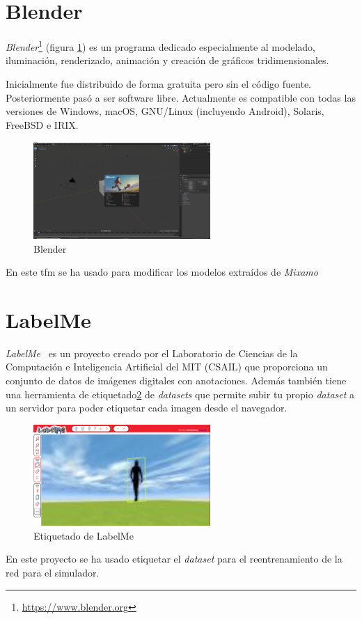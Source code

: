 \section{Blender} \label{sec:blender}
\textit{Blender}\footnote{\url{https://www.blender.org}} (figura \ref{fig:blender}) es un programa dedicado especialmente al modelado, iluminación, renderizado, animación y creación de gráficos tridimensionales.

Inicialmente fue distribuido de forma gratuita pero sin el código fuente. Posteriormente pasó a ser software libre. Actualmente es compatible con todas las versiones de Windows, macOS, GNU/Linux (incluyendo Android), Solaris, FreeBSD e IRIX.
\begin{figure}[H]
  \begin{center}
    \includegraphics[width=0.6\textwidth]{figures/herramientas/blender.png}
		\caption{Blender}
		\label{fig:blender}
		\end{center}
\end{figure}
En este \acrshort{tfm} se ha usado para modificar los modelos extraídos de \textit{Mixamo}
\section{LabelMe}
\textit{LabelMe}~\cite{labelme} es un proyecto creado por el Laboratorio de Ciencias de la Computación e Inteligencia Artificial del MIT (CSAIL) que proporciona un conjunto de datos de imágenes digitales con anotaciones. Además también tiene una herramienta de etiquetado\ref{fig:labelme} de \textit{datasets} que permite subir tu propio \textit{dataset} a un servidor para poder etiquetar cada imagen desde el navegador.
\begin{figure}[H]
  \begin{center}
    \includegraphics[width=0.6\textwidth]{figures/herramientas/labelme.png}
		\caption{Etiquetado de LabelMe}
		\label{fig:labelme}
		\end{center}
\end{figure}

En este proyecto se ha usado etiquetar el \textit{dataset} para el reentrenamiento de la red para el simulador.
